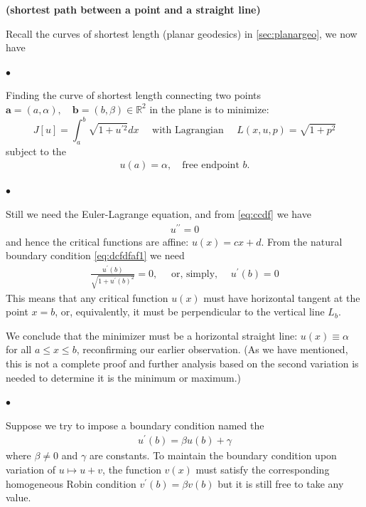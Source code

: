 \documentclass{article}
\newcommand{\bfs}[1]{\textbf{({#1}) }}
\begin{document}
\begin{exma}\bfs{shortest path between a point and a straight line}\label{exm:fdafadf}

Recall the curves of shortest length (planar geodesics) in \cref{sec:planargeo},  we now have

$\bullet$ 

Finding the curve of shortest length connecting two points $\mathbf{a}=(a, \alpha), \quad \mathbf{b}=(b, \beta) \in \mathbb{R}^{2}$ in the plane is to minimize:
$$\text{$J[u]=\int_{a}^{b} \sqrt{1+u^{\prime 2}} d x \quad$ with Lagrangian $\quad L(x, u, p)=\sqrt{1+p^{2}}$}$$
subject to the 
\begin{align*}
u(a)=\alpha, \quad \text{free endpoint $b$}.
\end{align*}

$\bullet$ 

Still we need the  Euler-Lagrange equation, and from \cref{eq:ccdf} we have 
\begin{align*}
u^{\prime \prime}=0
\end{align*}
and hence the critical functions are affine: $u(x)=c x+d$. 
From the natural boundary condition \cref{eq:dcfdfaf1} we need
\begin{align*}
\frac{u^{\prime}(b)}{\sqrt{1+u^{\prime}(b)^{2}}}=0, \quad \text { or, simply, } \quad u^{\prime}(b)=0
\end{align*}
This means that any critical function $u(x)$ must have horizontal tangent at the point $x=b$, or, equivalently, it must be perpendicular to the vertical line $L_{b}$.

We conclude that the minimizer must be a horizontal straight line: $u(x) \equiv \alpha$ for all $a \leq x \leq b$, reconfirming our earlier observation. (As we have mentioned, this is not a complete proof and further analysis based on the second variation is needed to determine it is the minimum or maximum.)

$\bullet$ 

Suppose we try to impose a  boundary condition named the 
\begin{align}
u^{\prime}(b)=\beta u(b)+\gamma \label{eq:robin}
\end{align}
where $\beta \neq 0$ and $\gamma$ are constants. To maintain the boundary condition upon variation of $u \longmapsto u+v$, the function $v(x)$ must satisfy the corresponding homogeneous Robin condition $v^{\prime}(b)=\beta v(b)$ but it is still free to take any value. 


\end{exma}
\end{document}
